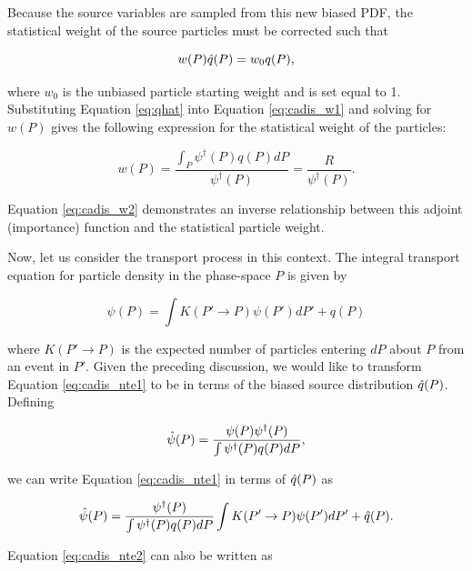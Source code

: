 Because the source variables are sampled from this new biased PDF, the statistical
weight of the source particles must be corrected such that

\begin{equation}
w(P)\hat{q}(P) = w_0q(P),
\label{eq:cadis_w1}
\end{equation}

\noindent where $w_0$ is the unbiased particle starting weight and is set equal to 1.
Substituting Equation \ref{eq:qhat} into Equation \ref{eq:cadis_w1} and solving for 
$w(P)$ gives the following expression for the statistical weight of the particles:

\begin{equation}
w(P) = \frac{\int_P\psi^{\dagger}(P)q(P)dP}{\psi^{\dagger}(P)}
= \frac{R}{\psi^{\dagger}(P)}.
\label{eq:cadis_w2}
\end{equation}

\noindent Equation \ref{eq:cadis_w2} demonstrates an inverse relationship between 
this adjoint (importance) function and the statistical particle weight. 

Now, let us consider the
transport process in this context. The integral transport equation for particle
density in the phase-space $P$ is given by

\begin{equation}
\psi(P) = \int K(P'\rightarrow P)\psi(P')dP' + q(P)
\label{eq:cadis_nte1}
\end{equation}

\noindent where $K(P'\rightarrow P)$ is the expected number of particles entering $dP$
about $P$ from an event in $P'$. Given the preceding discussion, we would like to 
transform Equation \ref{eq:cadis_nte1} to be in terms of the biased source 
distribution $\hat{q}(P)$. Defining

\begin{equation}
\hat{\psi}(P) = \frac{\psi(P)\psi^{\dagger}(P)}{\int \psi^{\dagger}(P)q(P)dP},
\end{equation}

\noindent we can write Equation \ref{eq:cadis_nte1} in terms of $\hat{q}(P)$ as

\begin{equation}
\hat{\psi}(P) = \frac{\psi^{\dagger}(P)}{\int \psi^{\dagger}(P)q(P)dP}
\int K(P'\rightarrow P)\psi(P')dP' + \hat{q}(P).
\label{eq:cadis_nte2}
\end{equation}

\noindent Equation \ref{eq:cadis_nte2} can also be written as

